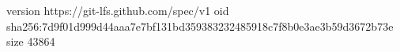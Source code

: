 version https://git-lfs.github.com/spec/v1
oid sha256:7d9f01d999d44aaa7e7bf131bd359383232485918c7f8b0e3ae3b59d3672b73e
size 43864
